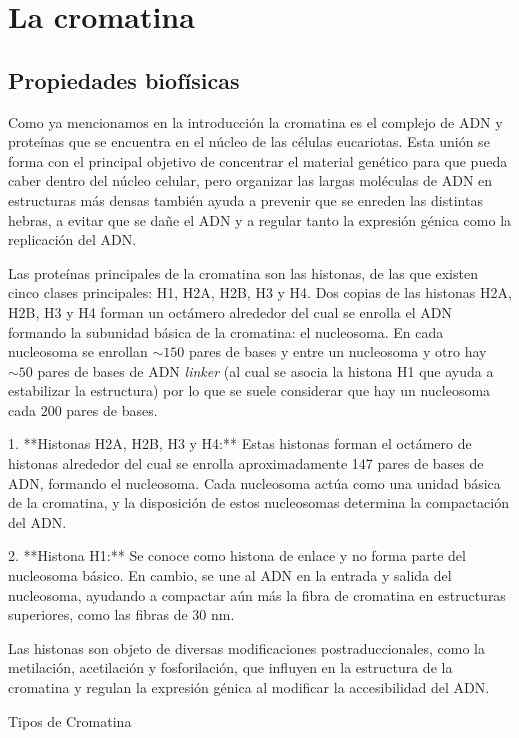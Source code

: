\chapter{La cromatina}
\label{cap:chromatin}

\section{Propiedades biofísicas}

Como ya mencionamos en la introducción la cromatina es el complejo de ADN y proteínas que se encuentra en el núcleo de las células eucariotas. Esta unión se forma con el principal objetivo de concentrar el material genético para que pueda caber dentro del núcleo celular, pero organizar las largas moléculas de ADN en estructuras más densas también ayuda a prevenir que se enreden las distintas hebras, a evitar que se dañe el ADN y a regular tanto la expresión génica como la replicación del ADN.

Las proteínas principales de la cromatina son las histonas, de las que existen cinco clases principales: H1, H2A, H2B, H3 y H4. Dos copias de las histonas H2A, H2B, H3 y H4 forman un octámero alrededor del cual se enrolla el ADN formando la subunidad básica de la cromatina: el nucleosoma. En cada nucleosoma se enrollan $\sim150$ pares de bases y entre un nucleosoma y otro hay $\sim50$ pares de bases de ADN \textit{linker} (al cual se asocia la histona H1 que ayuda a estabilizar la estructura) por lo que se suele considerar que hay un nucleosoma cada $200$ pares de bases.

1. **Histonas H2A, H2B, H3 y H4:** Estas histonas forman el octámero de histonas alrededor del cual se enrolla aproximadamente 147 pares de bases de ADN, formando el nucleosoma. Cada nucleosoma actúa como una unidad básica de la cromatina, y la disposición de estos nucleosomas determina la compactación del ADN.

2. **Histona H1:** Se conoce como histona de enlace y no forma parte del nucleosoma básico. En cambio, se une al ADN en la entrada y salida del nucleosoma, ayudando a compactar aún más la fibra de cromatina en estructuras superiores, como las fibras de 30 nm.

Las histonas son objeto de diversas modificaciones postraduccionales, como la metilación, acetilación y fosforilación, que influyen en la estructura de la cromatina y regulan la expresión génica al modificar la accesibilidad del ADN.

Tipos de Cromatina

